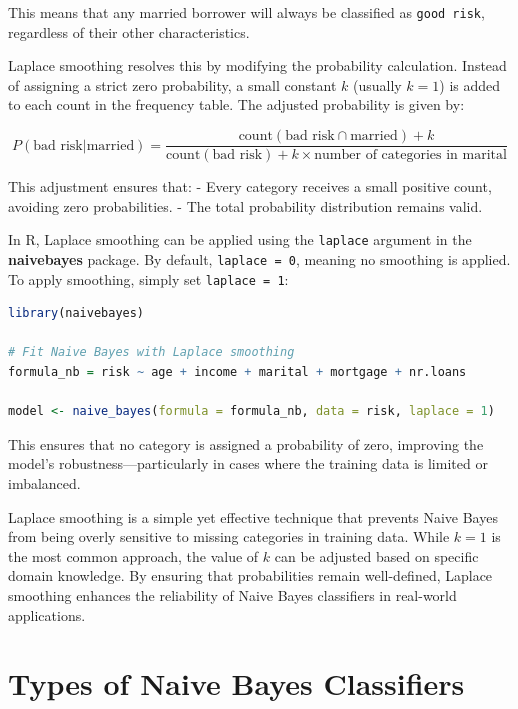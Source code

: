 \documentclass[
  11pt,
]{book}
\newcommand{\passthrough}[1]{#1}
\theoremstyle{definition}
\theoremstyle{definition}
\theoremstyle{definition}
\theoremstyle{definition}
\theoremstyle{remark}
\begin{document}
This means that any married borrower will always be classified as \passthrough{\lstinline!good risk!}, regardless of their other characteristics.

Laplace smoothing resolves this by modifying the probability calculation. Instead of assigning a strict zero probability, a small constant \(k\) (usually \(k = 1\)) is added to each count in the frequency table. The adjusted probability is given by:

\[
P(\text{bad risk} | \text{married}) = \frac{\text{count}(\text{bad risk} \cap \text{married}) + k}{\text{count}(\text{bad risk}) + k \times \text{number of categories in } \text{marital}}
\]

This adjustment ensures that:
- Every category receives a small positive count, avoiding zero probabilities.
- The total probability distribution remains valid.

In R, Laplace smoothing can be applied using the \passthrough{\lstinline!laplace!} argument in the \textbf{naivebayes} package. By default, \passthrough{\lstinline!laplace = 0!}, meaning no smoothing is applied. To apply smoothing, simply set \passthrough{\lstinline!laplace = 1!}:

\begin{lstlisting}[language=R]
library(naivebayes)

# Fit Naive Bayes with Laplace smoothing
formula_nb = risk ~ age + income + marital + mortgage + nr.loans

model <- naive_bayes(formula = formula_nb, data = risk, laplace = 1)
\end{lstlisting}

This ensures that no category is assigned a probability of zero, improving the model's robustness---particularly in cases where the training data is limited or imbalanced.

Laplace smoothing is a simple yet effective technique that prevents Naive Bayes from being overly sensitive to missing categories in training data. While \(k = 1\) is the most common approach, the value of \(k\) can be adjusted based on specific domain knowledge. By ensuring that probabilities remain well-defined, Laplace smoothing enhances the reliability of Naive Bayes classifiers in real-world applications.

\section{Types of Naive Bayes Classifiers}\label{types-of-naive-bayes-classifiers}
\end{document}

